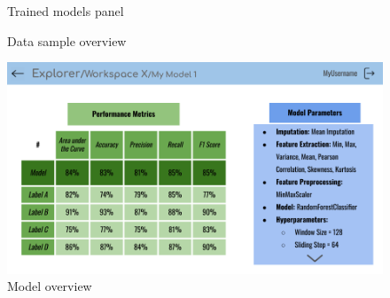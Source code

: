 \begin{figure}[ht]
    \centering
    \caption{Trained models panel} 
    \label{fig:models-panel} 
\end{figure}

\begin{figure}[ht]
    \centering
    \caption{Data sample overview}
    \label{fig:sample-overview}
\end{figure}

\begin{figure}[ht]
    \centering
    \includegraphics[width = .98\textwidth]{mockups/10.png}
    \caption{Model overview}
    \label{fig:model-overview}
\end{figure}

